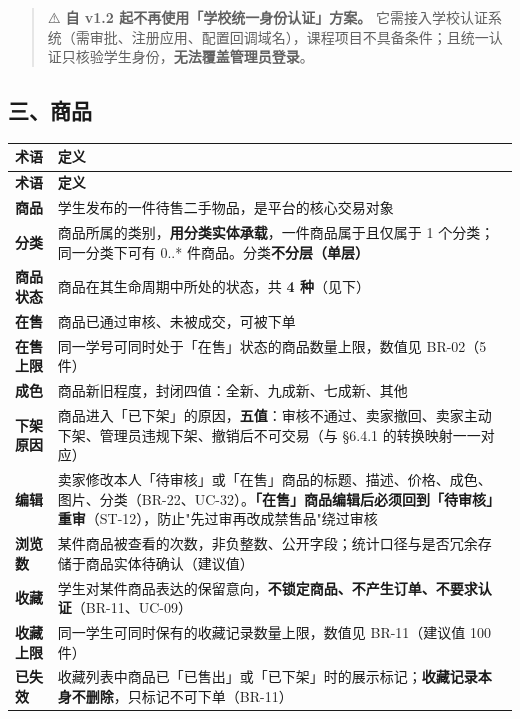 \documentclass[12pt,a4paper]{ctexart}
\begin{document}
\begin{quote}\small
⚠️ \textbf{自 v1.2 起不再使用「学校统一身份认证」方案。} 它需接入学校认证系统（需审批、注册应用、配置回调域名），课程项目不具备条件；且统一认证只核验学生身份，\textbf{无法覆盖管理员登录}。

\end{quote}

\subsection*{三、商品}

{\scriptsize
\begin{longtable}{|p{2.75cm}|p{13.25cm}|}
\hline
\textbf{术语} & \textbf{定义} \\
\hline
\endfirsthead
\hline
\textbf{术语} & \textbf{定义} \\
\hline
\endhead
\hline
\endfoot
\textbf{商品} & 学生发布的一件待售二手物品，是平台的核心交易对象 \\
\hline
\textbf{分类} & 商品所属的类别，\textbf{用分类实体承载}，一件商品属于且仅属于 1 个分类；同一分类下可有 0..* 件商品。分类\textbf{不分层（单层）} \\
\hline
\textbf{商品状态} & 商品在其生命周期中所处的状态，共 \textbf{4 种}（见下） \\
\hline
\textbf{在售} & 商品已通过审核、未被成交，可被下单 \\
\hline
\textbf{在售上限} & 同一学号可同时处于「在售」状态的商品数量上限，数值见 BR-02（5 件） \\
\hline
\textbf{成色} & 商品新旧程度，封闭四值：全新、九成新、七成新、其他 \\
\hline
\textbf{下架原因} & 商品进入「已下架」的原因，\textbf{五值}：审核不通过、卖家撤回、卖家主动下架、管理员违规下架、撤销后不可交易（与 §6.4.1 的转换映射一一对应） \\
\hline
\textbf{编辑} & 卖家修改本人「待审核」或「在售」商品的标题、描述、价格、成色、图片、分类（BR-22、UC-32）。\textbf{「在售」商品编辑后必须回到「待审核」重审}（ST-12），防止"先过审再改成禁售品"绕过审核 \\
\hline
\textbf{浏览数} & 某件商品被查看的次数，非负整数、公开字段；统计口径与是否冗余存储于商品实体待确认（建议值） \\
\hline
\textbf{收藏} & 学生对某件商品表达的保留意向，\textbf{不锁定商品、不产生订单、不要求认证}（BR-11、UC-09） \\
\hline
\textbf{收藏上限} & 同一学生可同时保有的收藏记录数量上限，数值见 BR-11（建议值 100 件） \\
\hline
\textbf{已失效} & 收藏列表中商品已「已售出」或「已下架」时的展示标记；\textbf{收藏记录本身不删除}，只标记不可下单（BR-11） \\
\hline
\end{longtable}
}
\end{document}

